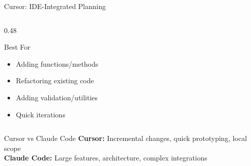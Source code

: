 \documentclass[aspectratio=169,10pt]{beamer}
\begin{document}
\begin{frame}{Cursor: IDE-Integrated Planning}
\begin{columns}[T]
\begin{column}{0.48\textwidth}
\begin{block}{Best For}
                \begin{itemize}
                    \item Adding functions/methods
                    \item Refactoring existing code
                    \item Adding validation/utilities
                    \item Quick iterations
                \end{itemize}
            \end{block}
        \end{column}
    \end{columns}
    \vspace{0.2cm}
    \begin{block}{Cursor vs Claude Code}
        \textbf{Cursor:} Incremental changes, quick prototyping, local scope\\
        \textbf{Claude Code:} Large features, architecture, complex integrations
    \end{block}

\end{frame}
\end{document}
